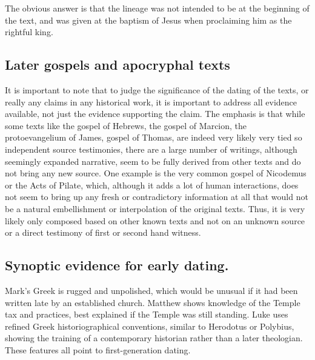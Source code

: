 The obvious answer is that the lineage was not intended to be at the beginning of the text, and was given at the baptism of Jesus when proclaiming him as the rightful king.

\subsection{Later gospels and apocryphal texts}\label{subsec:later-gospels-and-apocryphal-texts}

It is important to note that to judge the significance of the dating of the texts, or really any claims in any historical work, it is important to address all evidence available, not just the evidence supporting the claim.
The emphasis is that while some texts like the gospel of Hebrews, the gospel of Marcion, the protoevangelium of James, gospel of Thomas, are indeed very likely very tied so independent source testimonies, there are a large number of writings, although seemingly expanded narrative, seem to be fully derived from other texts and do not bring any new source.
One example is the very common gospel of Nicodemus or the Acts of Pilate, which, although it adds a lot of human interactions, does not seem to bring up any fresh or contradictory information at all that would not be a natural embellishment or interpolation of the original texts.
Thus, it is very likely only composed based on other known texts and not on an unknown source or a direct testimony of first or second hand witness.

\subsection{Synoptic evidence for early dating.}\label{subsec:synoptic-evidence-for-early-dating.}

Mark’s Greek is rugged and unpolished, which would be unusual if it had been written late by an established church.
Matthew shows knowledge of the Temple tax and practices, best explained if the Temple was still standing.
Luke uses refined Greek historiographical conventions, similar to Herodotus or Polybius, showing the training of a contemporary historian rather than a later theologian.
These features all point to first-generation dating.
